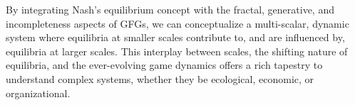 \documentclass{article}
\begin{document}
\begin{center}
\end{center}

\bigskip

\noindent By integrating Nash's equilibrium concept with the fractal, generative, and incompleteness aspects of GFGs, we can conceptualize a multi-scalar, dynamic system where equilibria at smaller scales contribute to, and are influenced by, equilibria at larger scales. This interplay between scales, the shifting nature of equilibria, and the ever-evolving game dynamics offers a rich tapestry to understand complex systems, whether they be ecological, economic, or organizational.
\end{document}
